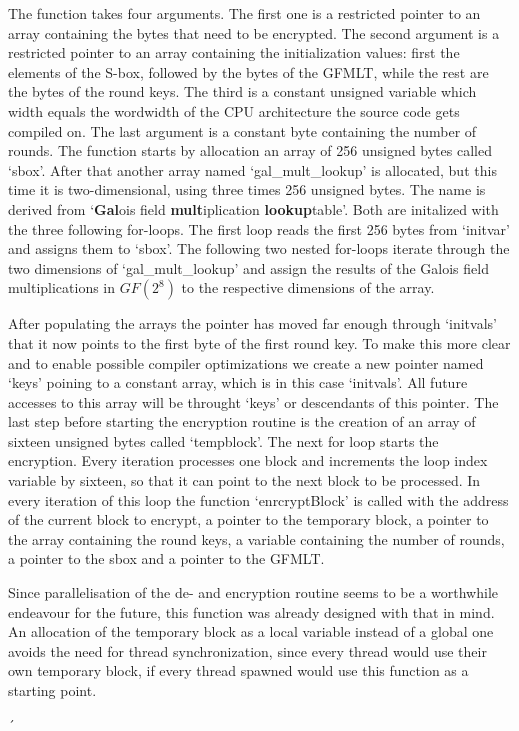 The function takes four arguments. The first one is a restricted pointer
to an array containing the bytes that need to be encrypted. The second
argument is a restricted pointer to an array containing the
initialization values: first the elements of the S-box, followed by the
bytes of the GFMLT, while the rest are the bytes of the round keys. The
third is a constant unsigned variable which width equals the wordwidth
of the CPU architecture the source code gets compiled on. The last
argument is a constant byte containing the number of rounds. The
function starts by allocation an array of 256 unsigned bytes called
`sbox'. After that another array named `gal\_mult\_lookup' is allocated,
but this time it is two-dimensional, using three times 256 unsigned
bytes. The name is derived from `\textbf{Gal}ois field
\textbf{mult}iplication \textbf{lookup}table'. Both are initalized with
the three following for-loops. The first loop reads the first 256 bytes
from `initvar' and assigns them to `sbox'. The following two nested
for-loops iterate through the two dimensions of `gal\_mult\_lookup' and
assign the results of the Galois field multiplications in $GF(2^{8})$ to the
respective dimensions of the array.

After populating the arrays the pointer has moved far enough through
`initvals' that it now points to the first byte of the first round key.
To make this more clear and to enable possible compiler optimizations we
create a new pointer named `keys' poining to a constant array, which is
in this case `initvals'. All future accesses to this array will be
throught `keys' or descendants of this pointer. The last step before
starting the encryption routine is the creation of an array of sixteen
unsigned bytes called `tempblock'. The next for loop starts the
encryption. Every iteration processes one block and increments the loop
index variable by sixteen, so that it can point to the next block to be
processed. In every iteration of this loop the function `enrcryptBlock'
is called with the address of the current block to encrypt, a pointer to
the temporary block, a pointer to the array containing the round keys, a
variable containing the number of rounds, a pointer to the sbox and a
pointer to the GFMLT.

Since parallelisation of the de- and encryption routine seems to be a
worthwhile endeavour for the future, this function was already designed
with that in mind. An allocation of the temporary block as a local
variable instead of a global one avoids the need for thread
synchronization, since every thread would use their own temporary block,
if every thread spawned would use this function as a starting point.


´
